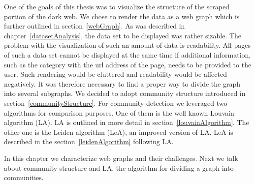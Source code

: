 One of the goals of this thesis was to visualize the structure of the scraped portion of the dark web. We chose to render the data as a web graph which is further outlined in section~\ref{webGraph}. As was described in chapter~\ref{datasetAnalysis}, the data set to be displayed was rather sizable. The problem with the visualization of such an amount of data is readability. All pages of such a data set cannot be displayed at the same time if additional information, such as the category with the url address of the page, needs to be provided to the user. Such rendering would be cluttered and readability would be affected negatively. It was therefore necessary to find a proper way to divide the graph into several subgraphs. We decided to adopt community structure introduced in section~\ref{communityStructure}. For community detection we leveraged two algorithms for comparison purposes. One of them is the well known Louvain algorithm (LA). LA is outlined in more detail in section~\ref{louvainAlgorithm}. The other one is the Leiden algorithm (LeA), an improved version of LA. LeA is described in the section~\ref{leidenAlgorithm} following LA.

In this chapter we characterize web graphs and their challenges. Next we talk about community structure and LA, the algorithm for dividing a graph into communities. 
 

